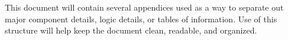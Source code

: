 
This document will contain several appendices used as a way to separate out major 
component details, logic details, or tables of information.  Use of this structure 
will help keep the document clean, readable, and organized. 

